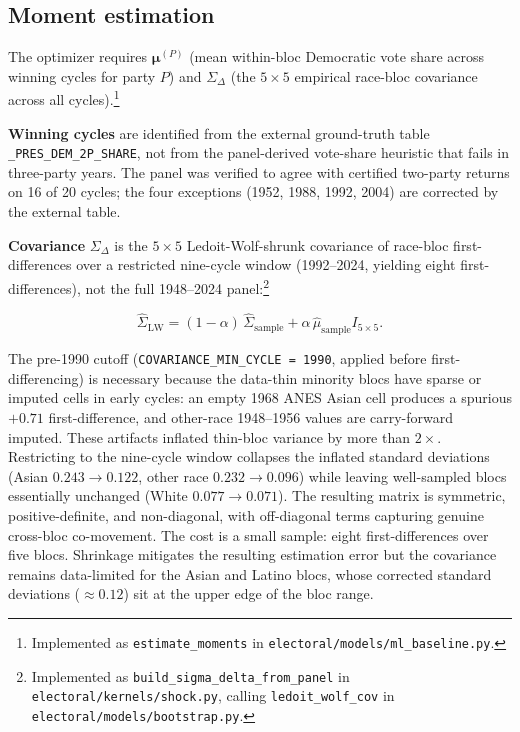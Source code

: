\documentclass[12pt, letterpaper]{article}
\theoremstyle{definition}
\newcommand{\SigmaDelta}{\Sigma_{\Delta}}
\newcommand{\boldmu}{\boldsymbol{\mu}}
\begin{document}
\subsection{Moment estimation}
\label{sec:moments}

The optimizer requires $\boldmu^{(P)}$ (mean within-bloc Democratic vote share
across winning cycles for party $P$) and $\SigmaDelta$ (the $5\times5$
empirical race-bloc covariance across all cycles).\footnote{Implemented as
\texttt{estimate\_moments} in \texttt{electoral/models/ml\_baseline.py}.}

\textbf{Winning cycles} are identified from the external ground-truth table
\texttt{\_PRES\_DEM\_2P\_SHARE}, not from the panel-derived vote-share
heuristic that fails in three-party years. The panel was verified to agree
with certified two-party returns on 16 of 20 cycles; the four exceptions
(1952, 1988, 1992, 2004) are corrected by the external table.

\textbf{Covariance} $\SigmaDelta$ is the $5\times5$ Ledoit-Wolf-shrunk covariance
\citep{Ledoit2004} of race-bloc first-differences over a restricted nine-cycle window
(1992--2024, yielding eight first-differences), not the full 1948--2024
panel:\footnote{Implemented as \texttt{build\_sigma\_delta\_from\_panel} in
\texttt{electoral/kernels/shock.py}, calling \texttt{ledoit\_wolf\_cov} in
\texttt{electoral/models/bootstrap.py}.}

\begin{equation}
  \hat{\Sigma}_{\mathrm{LW}} = (1 - \alpha)\, \hat{\Sigma}_{\mathrm{sample}}
  + \alpha\, \hat{\mu}_{\mathrm{sample}} I_{5\times5}.
  \label{eq:ledoitwolf}
\end{equation}

The pre-1990 cutoff (\texttt{COVARIANCE\_MIN\_CYCLE = 1990}, applied before
first-differencing) is necessary because the data-thin minority blocs have sparse or
imputed cells in early cycles: an empty 1968 ANES Asian cell produces a spurious
$+0.71$ first-difference, and other-race 1948--1956 values are carry-forward imputed.
These artifacts inflated thin-bloc variance by more than $2\times$. Restricting to the
nine-cycle window collapses the inflated standard deviations
(Asian $0.243 \rightarrow 0.122$, other race $0.232 \rightarrow 0.096$) while leaving
well-sampled blocs essentially unchanged (White $0.077 \rightarrow 0.071$). The
resulting matrix is symmetric, positive-definite, and non-diagonal, with off-diagonal
terms capturing genuine cross-bloc co-movement. The cost is a small sample: eight
first-differences over five blocs. Shrinkage mitigates the resulting estimation error
but the covariance remains data-limited for the Asian and Latino blocs, whose corrected
standard deviations ($\approx 0.12$) sit at the upper edge of the bloc range.
\end{document}
